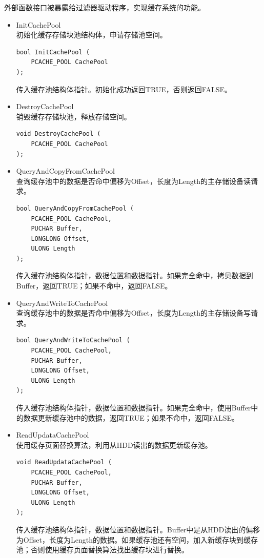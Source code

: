 外部函数接口被暴露给过滤器驱动程序，实现缓存系统的功能。

\begin{itemize}

\item InitCachePool
\\初始化缓存存储块池结构体，申请存储池空间。
\begin{lstlisting}
bool InitCachePool (
    PCACHE_POOL CachePool
);
\end{lstlisting}
传入缓存池结构体指针。初始化成功返回TRUE，否则返回FALSE。

\item DestroyCachePool
\\销毁缓存存储块池，释放存储空间。
\begin{lstlisting}
void DestroyCachePool (
    PCACHE_POOL CachePool
);
\end{lstlisting}

\item QueryAndCopyFromCachePool
\\查询缓存池中的数据是否命中偏移为Offset，长度为Length的主存储设备读请求。
\begin{lstlisting}
bool QueryAndCopyFromCachePool (
    PCACHE_POOL CachePool,
    PUCHAR Buffer,
    LONGLONG Offset,
    ULONG Length
);
\end{lstlisting}
传入缓存池结构体指针，数据位置和数据指针。如果完全命中，拷贝数据到Buffer，返回TRUE；如果不命中，返回FALSE。

\item QueryAndWriteToCachePool
\\查询缓存池中的数据是否命中偏移为Offset，长度为Length的主存储设备写请求。
\begin{lstlisting}
bool QueryAndWriteToCachePool (
    PCACHE_POOL CachePool,
    PUCHAR Buffer,
    LONGLONG Offset,
    ULONG Length
);
\end{lstlisting}
传入缓存池结构体指针，数据位置和数据指针。如果完全命中，使用Buffer中的数据更新缓存池中的数据，返回TRUE；如果不命中，返回FALSE。

\item ReadUpdataCachePool
\\使用缓存页面替换算法，利用从HDD读出的数据更新缓存池。
\begin{lstlisting}
void ReadUpdataCachePool (
    PCACHE_POOL CachePool,
    PUCHAR Buffer,
    LONGLONG Offset,
    ULONG Length
);
\end{lstlisting}
传入缓存池结构体指针，数据位置和数据指针。Buffer中是从HDD读出的偏移为Offset，长度为Length的数据。如果缓存池还有空间，加入新缓存块到缓存池；否则使用缓存页面替换算法找出缓存块进行替换。


\end{itemize}
